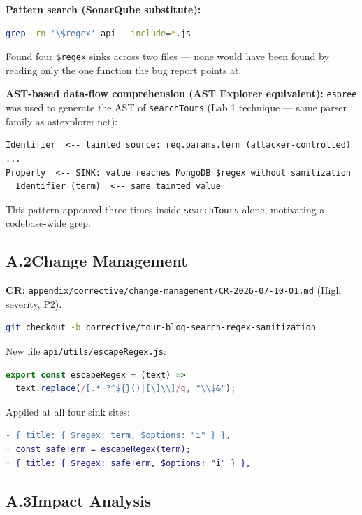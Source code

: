 \documentclass[11pt,a4paper]{article}
\begin{document}
\medskip\noindent\textbf{Pattern search (SonarQube substitute):}
\begin{lstlisting}[language=bash]
grep -rn '\$regex' api --include=*.js
\end{lstlisting}
Found four \texttt{\$regex} sinks across two files --- none would have been found
by reading only the one function the bug report points at.

\medskip\noindent\textbf{AST-based data-flow comprehension (AST Explorer equivalent):}
\texttt{espree} was used to generate the AST of \texttt{searchTours}
(Lab 1 technique --- same parser family as astexplorer.net):
\begin{lstlisting}
Identifier  <-- tainted source: req.params.term (attacker-controlled)
...
Property  <-- SINK: value reaches MongoDB $regex without sanitization
  Identifier (term)  <-- same tainted value
\end{lstlisting}
This pattern appeared three times inside \texttt{searchTours} alone,
motivating a codebase-wide grep.

\subsection{A.2\quad Change Management}

\noindent\textbf{CR:} \texttt{appendix/corrective/change-management/CR-2026-07-10-01.md}
(High severity, P2).

\begin{lstlisting}[language=bash]
git checkout -b corrective/tour-blog-search-regex-sanitization
\end{lstlisting}

New file \texttt{api/utils/escapeRegex.js}:
\begin{lstlisting}[language=JavaScript]
export const escapeRegex = (text) =>
  text.replace(/[.*+?^${}()|[\]\\]/g, "\\$&");
\end{lstlisting}

Applied at all four sink sites:
\begin{lstlisting}[language=diff]
- { title: { $regex: term, $options: "i" } },
+ const safeTerm = escapeRegex(term);
+ { title: { $regex: safeTerm, $options: "i" } },
\end{lstlisting}

\subsection{A.3\quad Impact Analysis}
\end{document}
